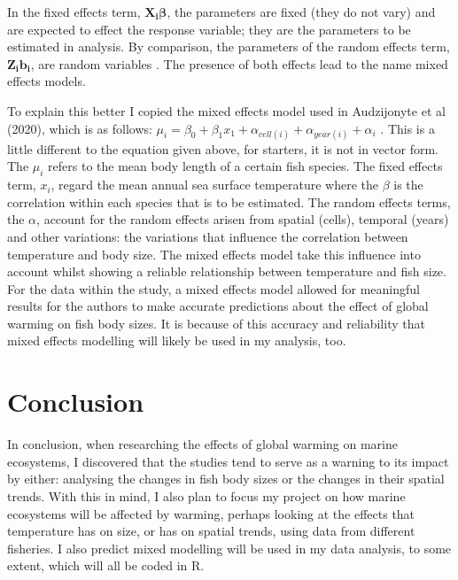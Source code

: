 \documentclass{article}
\begin{document}
In the fixed effects term, $\mathbf{X_i {\boldsymbol\beta}}$, the parameters are fixed (they do not vary) and are expected to effect the response variable; they are the parameters to be estimated in analysis. By comparison, the parameters of the random effects term, $\mathbf{Z_i b_i}$, are random variables \cites{14, 15}. The presence of both effects lead to the name mixed effects models. 

To explain this better I copied the mixed effects model used in Audzijonyte et al (2020), which is as follows: $\mu_i = \beta_0 + \beta_1 x_1 + \alpha_{cell(i)} + \alpha_{year(i)} + \alpha_i$ . This is a little different to the equation given above, for starters, it is not in vector form. The $\mu_i$ refers to the mean body length of a certain fish species. The fixed effects term, $x_i$, regard the mean annual sea surface temperature where the $\beta$ is the correlation within each species that is to be estimated. The random effects terms, the $\alpha$, account for the random effects arisen from spatial (cells), temporal (years) and other variations: the variations that influence the correlation between temperature and body size. The mixed effects model take this influence into account whilst showing a reliable relationship between temperature and fish size. For the data within the study, a mixed effects model allowed for meaningful results for the authors to make accurate predictions about the effect of global warming on fish body sizes. It is because of this accuracy and reliability that mixed effects modelling will likely be used in my analysis, too.

\section{Conclusion}

In conclusion, when researching the effects of global warming on marine ecosystems, I discovered that the studies tend to serve as a warning to its impact by either: analysing the changes in fish body sizes or the changes in their spatial trends. With this in mind, I also plan to focus my project on how marine ecosystems will be affected by warming, perhaps looking at the effects that temperature has on size, or has on spatial trends, using data from different fisheries. I also predict mixed modelling will be used in my data analysis, to some extent, which will all be coded in R.
\end{document}
